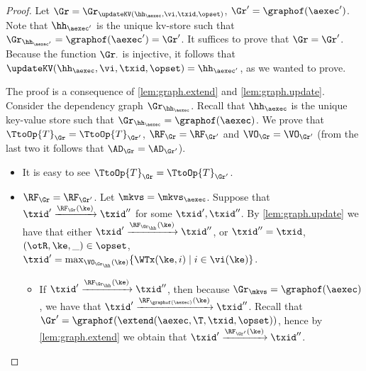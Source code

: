 \begin{proof}
Let $\Gr = \Gr_{\updateKV(\hh_{\aexec}, \vi, \txid, \opset)}$, $\Gr' = \graphof(\aexec')$. 
Note that $\hh_{\aexec'}$ is the unique kv-store such that $\Gr_{\hh_{\aexec'}} = \graphof(\aexec') = \Gr'$. 
It suffices to prove that $\Gr = \Gr'$. Because the function $\Gr_{\cdot}$ is injective, it follows that 
$\updateKV(\hh_{\aexec}, \vi, \txid, \opset) = \hh_{\aexec'}$, as we wanted to prove.  

The proof is a consequence of \cref{lem:graph.extend} and \cref{lem:graph.update}. 
Consider the dependency graph $\Gr_{\hh_{\aexec}}$.
Recall that $\hh_{\aexec}$ is the unique key-value store such that $\Gr_{\hh_{\aexec}} = \graphof(\aexec)$. 
We prove that $\TtoOp{T}_{\Gr} = \TtoOp{T}_{\Gr'}$, $\RF_{\Gr} = \RF_{\Gr'}$ and 
$\VO_{\Gr} = \VO_{\Gr'}$ (from the last two it follows that $\AD_{\Gr} = \AD_{\Gr'}$). 
\begin{itemize}
\item It is easy to see $\TtoOp{T}_{\Gr} = \TtoOp{T}_{\Gr'}$.

\item $\RF_{\Gr} = \RF_{\Gr'}$.
Let \( \mkvs  = \mkvs_\aexec \).
Suppose that $\txid' \xrightarrow{\RF_{\Gr}(\ke)} \txid''$ for some $\txid', \txid''$. 
By \cref{lem:graph.update} we have that either $\txid' \xrightarrow{\RF_{\Gr_\hh}(\ke)} \txid''$, 
or $\txid'' = \txid$, $(\otR, \ke, \_) \in \opset$, $\txid' = \max_{\VO_{\Gr_\hh}(\ke)}\{\WTx(\ke, i) \mid i \in \vi(\ke)\}$. 

\begin{itemize}
\item If $\txid' \xrightarrow{\RF_{\Gr_\hh}(\ke)} \txid''$, then because 
$\Gr_\mkvs = \graphof(\aexec)$, we have that $\txid' \xrightarrow{\RF_{\graphof(\aexec)}(\ke)} \txid''$. 
Recall that $\Gr' = \graphof(\extend(\aexec, \T, \txid, \opset))$, hence by \cref{lem:graph.extend} 
we obtain that $\txid' \xrightarrow{\RF_{\Gr'}(\ke)} \txid''$. 


\end{itemize}
\end{itemize}
\end{proof}
